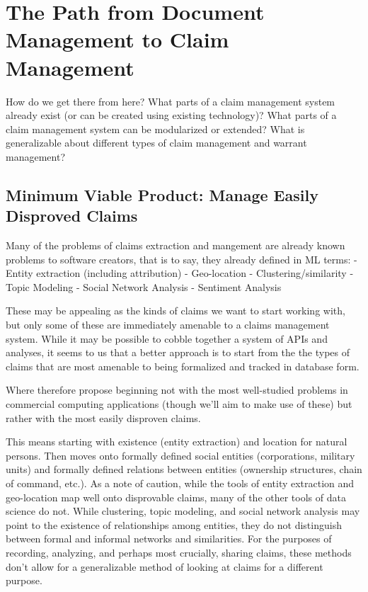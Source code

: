 \documentclass[format=siggraph, review=true]{acmart}
\begin{document}
\section{The Path from Document Management to Claim Management}
How do we get there from here? What parts of a claim management system already exist (or can be created using existing technology)? What parts of a claim management system can be modularized or extended? What is generalizable about different types of claim management and warrant management? 

\subsection{Minimum Viable Product: Manage Easily Disproved Claims}
Many of the problems of claims extraction and mangement are already known problems to software creators, that is to say, they already defined in ML terms: 
- Entity extraction (including attribution)
- Geo-location
- Clustering/similarity
- Topic Modeling
- Social Network Analysis
- Sentiment Analysis

These may be appealing as the kinds of claims we want to start working with, but only some of these are immediately amenable to a claims management system. While it may be possible to cobble together a system of APIs and analyses, it seems to us that a better approach is to start from the the types of claims that are most amenable to being formalized and tracked in database form. 

Where therefore propose beginning not with the most well-studied problems in commercial computing applications (though we'll aim to make use of these) but rather with the most easily disproven claims. 

This means starting with existence (entity extraction) and location for natural persons. Then moves onto formally defined social entities (corporations, military units) and formally defined relations between entities (ownership structures, chain of command, etc.). As a note of caution, while the tools of entity extraction and geo-location map well onto disprovable claims, many of the other tools of data science do not. While clustering, topic modeling, and social network analysis may point to the existence of relationships among entities, they do not distinguish between formal and informal networks and similarities. For the purposes of recording, analyzing, and perhaps most crucially, sharing claims, these methods don't allow for a generalizable method of looking at claims for a different purpose.
\end{document}
